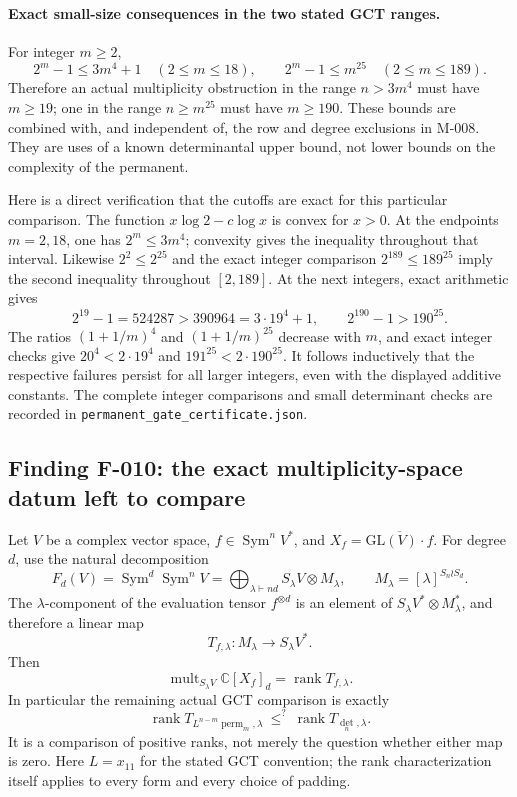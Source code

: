 \paragraph{Exact small-size consequences in the two stated GCT ranges.}
For integer \(m\geq2\),
\[
 2^m-1\leq3m^4+1\quad(2\leq m\leq18),\qquad
 2^m-1\leq m^{25}\quad(2\leq m\leq189).
\]
Therefore an actual multiplicity obstruction in the range
\(n>3m^4\) must have \(m\geq19\); one in the range
\(n\geq m^{25}\) must have \(m\geq190\).
These bounds are combined with, and independent of, the row and
degree exclusions in M-008.  They are uses of a known determinantal
upper bound, not lower bounds on the complexity of the permanent.

Here is a direct verification that the cutoffs are exact for this
particular comparison.  The function
\(x\log2-c\log x\) is convex for \(x>0\).
At the endpoints \(m=2,18\), one has \(2^m\leq3m^4\);
convexity gives the inequality throughout that interval.
Likewise \(2^2\leq2^{25}\) and the exact integer comparison
\(2^{189}\leq189^{25}\) imply the second inequality
throughout \([2,189]\).
At the next integers, exact arithmetic gives
\[
 2^{19}-1=524287>390964=3\cdot19^4+1,
 \qquad 2^{190}-1>190^{25}.
\]
The ratios \((1+1/m)^4\) and \((1+1/m)^{25}\) decrease with
\(m\), and exact integer checks give
\(20^4<2\cdot19^4\) and \(191^{25}<2\cdot190^{25}\).
It follows inductively that the respective failures persist for
all larger integers, even with the displayed additive constants.
The complete integer comparisons and small determinant checks
are recorded in \texttt{permanent\_gate\_certificate.json}.

\subsection*{Finding F-010: the exact multiplicity-space datum left to compare}
Let \(V\) be a complex vector space, \(f\in\operatorname{Sym}^nV^*\),
and \(X_f=\overline{\mathrm{GL}(V)\cdot f}\).
For degree \(d\), use the natural decomposition
\[
 F_d(V)=\operatorname{Sym}^d\operatorname{Sym}^nV
       =\bigoplus_{\lambda\vdash nd}S_\lambda V\otimes M_\lambda,
 \qquad M_\lambda=[\lambda]^{S_n\wr S_d}.
\]
The \(\lambda\)-component of the evaluation tensor \(f^{\otimes d}\)
is an element of
\(S_\lambda V^*\otimes M_\lambda^*\), and therefore a linear map
\[
                    T_{f,\lambda}:M_\lambda\longrightarrow S_\lambda V^*.
\]
Then
\begin{equation}\label{eq:F010}
 \operatorname{mult}_{S_\lambda V}\mathbb C[X_f]_d
                  =\operatorname{rank}T_{f,\lambda}.
\end{equation}
In particular the remaining actual GCT comparison is exactly
\[
 \operatorname{rank}T_{L^{n-m}\operatorname{perm}_m,\lambda}
                 \ \mathop{\leq}^{?}\
 \operatorname{rank}T_{\det_n,\lambda}.
\]
It is a comparison of positive ranks, not merely the question whether
either map is zero. Here \(L=x_{11}\) for the stated GCT convention;
the rank characterization itself applies to every form and every
choice of padding.

